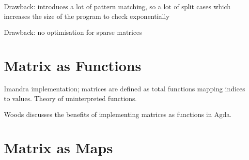 \documentclass[runningheads]{llncs}
\begin{document}
Drawback: introduces a lot of pattern matching, so a lot of split cases which increases the size of the program to check exponentially

Drawback: no optimisation for sparse matrices

\section{Matrix as Functions}
Imandra implementation; matrices are defined as total functions mapping indices to values.
Theory of uninterpreted functions.

Woods \cite{wood_vectors_2019} discusses the benefits of implementing matrices as functions in Agda.

\section{Matrix as Maps}

%
%
%


\end{document}
